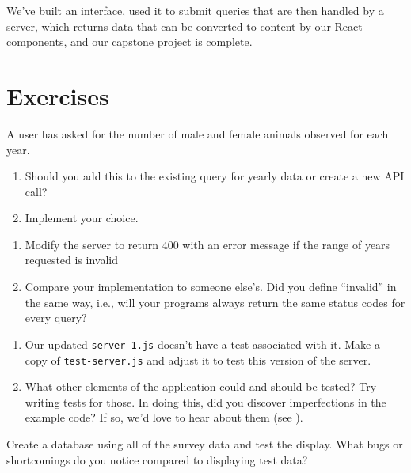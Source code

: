 
We've built an interface,
used it to submit queries that are then handled by a server,
which returns data that can be converted to content by our React components,
and our capstone project is complete.

\section{Exercises}\label{s:capstone-exercises}


A user has asked for the number of male and female animals observed for each year.

\begin{enumerate}
\item
  Should you add this to the existing query for yearly data or create a new API call?
\item
  Implement your choice.
\end{enumerate}


\begin{enumerate}
\item
  Modify the server to return 400 with an error message
  if the range of years requested is invalid
\item
  Compare your implementation to someone else's.
  Did you define ``invalid'' in the same way,
  i.e.,
  will your programs always return the same status codes for every query?
\end{enumerate}


\begin{enumerate}
\item
  Our updated \texttt{server-1.js} doesn't have a test associated with it.
  Make a copy of \texttt{test-server.js} and adjust it to test this version of the
  server.
\item
  What other elements of the application could and should be tested?
  Try writing tests for those.
  In doing this, did you discover imperfections in the example code?
  If so, we'd love to hear about them (see ).
\end{enumerate}


Create a database using all of the survey data and test the display.
What bugs or shortcomings do you notice compared to displaying test data?

